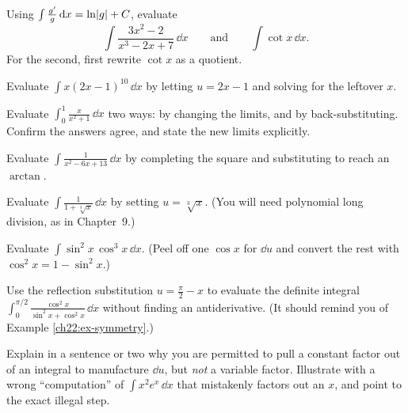 \begin{exercise}
Using $\int \frac{g'}{g}\,\mathrm{d} x = \ln\lvert g\rvert + C$, evaluate
\[
  \int \frac{3x^2 - 2}{x^3 - 2x + 7}\,\dd x
  \qquad\text{and}\qquad
  \int \cot x\,\dd x.
\]
For the second, first rewrite $\cot x$ as a
quotient.
\end{exercise}

\begin{exercise}
Evaluate $\displaystyle \int x(2x-1)^{10}\,\dd x$ by letting $u = 2x-1$ and solving
for the leftover $x$.
\end{exercise}

\begin{exercise}
Evaluate $\displaystyle \int_0^{1} \frac{x}{x^2+1}\,\dd x$ two ways: by changing the
limits, and by back-substituting. Confirm the answers agree, and state the new
limits explicitly.
\end{exercise}

\begin{exercise}
Evaluate $\displaystyle \int \frac{1}{x^2 - 6x + 13}\,\dd x$ by completing the square
and substituting to reach an $\arctan$.
\end{exercise}

\begin{exercise}[Rationalize]
Evaluate $\displaystyle \int \frac{1}{1+\sqrt[3]{x}}\,\dd x$ by setting $u =
\sqrt[3]{x}$. (You will need polynomial long division, as in Chapter~9.)
\end{exercise}

\begin{exercise}
Evaluate $\displaystyle \int \sin^2 x\,\cos^3 x\,\dd x$. (Peel off one $\cos x$ for
$\dd u$ and convert the rest with $\cos^2 x = 1-\sin^2 x$.)
\end{exercise}

\begin{exercise}[Symmetry]
Use the reflection substitution $u = \tfrac{\pi}{2}-x$ to evaluate the definite integral
$\displaystyle \int_0^{\pi/2} \frac{\cos^2 x}{\sin^2 x + \cos^2 x}\,\dd x$ without
finding an antiderivative. (It should remind you of Example \ref{ch22:ex-symmetry}.)
\end{exercise}

\begin{exercise}
Explain in a sentence or two why you are permitted to pull a constant factor out of
an integral to manufacture $\dd u$, but \emph{not} a variable factor. Illustrate
with a wrong ``computation'' of $\int x^2 e^{x}\,\dd x$ that mistakenly factors out
an $x$, and point to the exact illegal step.
\end{exercise}

